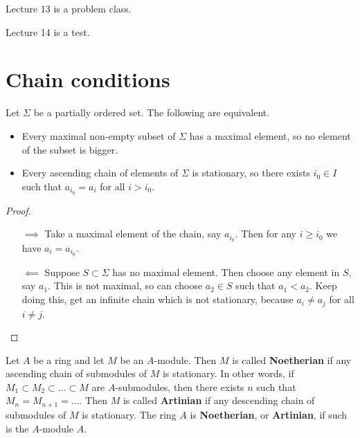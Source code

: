 
Lecture 13 is a problem class.


Lecture 14 is a test.

\pagebreak

\section{Chain conditions}


\begin{lemma}
Let $ \Sigma $ be a partially ordered set. The following are equivalent.
\begin{itemize}
\item Every maximal non-empty subset of $ \Sigma $ has a maximal element, so no element of the subset is bigger.
\item Every ascending chain of elements of $ \Sigma $ is stationary, so there exists $ i_0 \in I $ such that $ a_{i_0} = a_i $ for all $ i > i_0 $.
\end{itemize}
\end{lemma}

\begin{proof}
\hfill
\begin{enumerate}
\item[$ \implies $] Take a maximal element of the chain, say $ a_{i_0} $. Then for any $ i \ge i_0 $ we have $ a_i = a_{i_0} $.
\item[$ \impliedby $] Suppose $ S \subset \Sigma $ has no maximal element. Then choose any element in $ S $, say $ a_1 $. This is not maximal, so can choose $ a_2 \in S $ such that $ a_1 < a_2 $. Keep doing this, get an infinite chain which is not stationary, because $ a_i \ne a_j $ for all $ i \ne j $.
\end{enumerate}
\end{proof}

\begin{definition}
Let $ A $ be a ring and let $ M $ be an $ A $-module. Then $ M $ is called \textbf{Noetherian} if any ascending chain of submodules of $ M $ is stationary. In other words, if $ M_1 \subset M_2 \subset \dots \subset M $ are $ A $-submodules, then there exists $ n $ such that $ M_n = M_{n + 1} = \dots $. Then $ M $ is called \textbf{Artinian} if any descending chain of submodules of $ M $ is stationary. The ring $ A $ is \textbf{Noetherian}, or \textbf{Artinian}, if such is the $ A $-module $ A $.
\end{definition}

